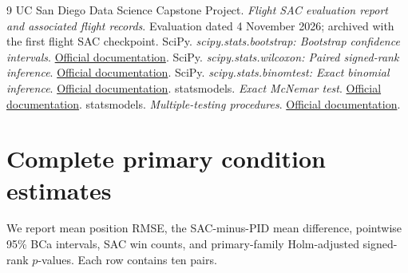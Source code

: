\documentclass[11pt,a4paper]{article}
\begin{document}
\begin{thebibliography}{9}
 UC San Diego Data Science Capstone Project. \emph{Flight SAC evaluation report and associated flight records}. Evaluation dated 4 November 2026; archived with the first flight SAC checkpoint.
 SciPy. \emph{scipy.stats.bootstrap: Bootstrap confidence intervals}. \href{https://docs.scipy.org/doc/scipy/reference/generated/scipy.stats.bootstrap.html}{Official documentation}.
 SciPy. \emph{scipy.stats.wilcoxon: Paired signed-rank inference}. \href{https://docs.scipy.org/doc/scipy/reference/generated/scipy.stats.wilcoxon.html}{Official documentation}.
 SciPy. \emph{scipy.stats.binomtest: Exact binomial inference}. \href{https://docs.scipy.org/doc/scipy/reference/generated/scipy.stats.binomtest.html}{Official documentation}.
 statsmodels. \emph{Exact McNemar test}. \href{https://www.statsmodels.org/stable/generated/statsmodels.stats.contingency_tables.mcnemar.html}{Official documentation}.
 statsmodels. \emph{Multiple-testing procedures}. \href{https://www.statsmodels.org/stable/generated/statsmodels.stats.multitest.multipletests.html}{Official documentation}.
\end{thebibliography}

\clearpage
\appendix
\section{Complete primary condition estimates}\label{app:primary}
We report mean position RMSE, the SAC-minus-PID mean difference, pointwise 95\% BCa intervals, SAC win counts, and primary-family Holm-adjusted signed-rank $p$-values. Each row contains ten pairs.
\end{document}
